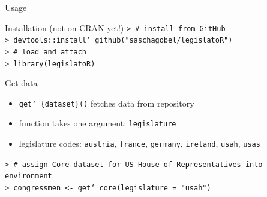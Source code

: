 \iffalse
\begin{frame}{Usage}
\begin{block}{Installation (not on CRAN yet!)}
\scriptsize{\texttt{> \# install from GitHub}} \\
\scriptsize{\texttt{> devtools::install\char`_github("saschagobel/legislatoR")}} \\
\scriptsize{\texttt{> \# load and attach}} \\
\scriptsize{\texttt{> library(legislatoR)}}
\end{block}
\pause
\begin{block}{Get data}
\begin{itemize}
\item \texttt{get\char`_\{dataset\}()} fetches data from repository
\item function takes one argument: \texttt{legislature}
\item legislature codes: \texttt{austria}, \texttt{france}, \texttt{germany}, \texttt{ireland}, \texttt{usah}, \texttt{usas} 
\end{itemize}
\scriptsize{\texttt{> \# assign Core dataset for US House of Representatives into environment}} \\
\scriptsize{\texttt{> congressmen <- get\char`_core(legislature = "usah")}}
\end{block}
\end{frame}

